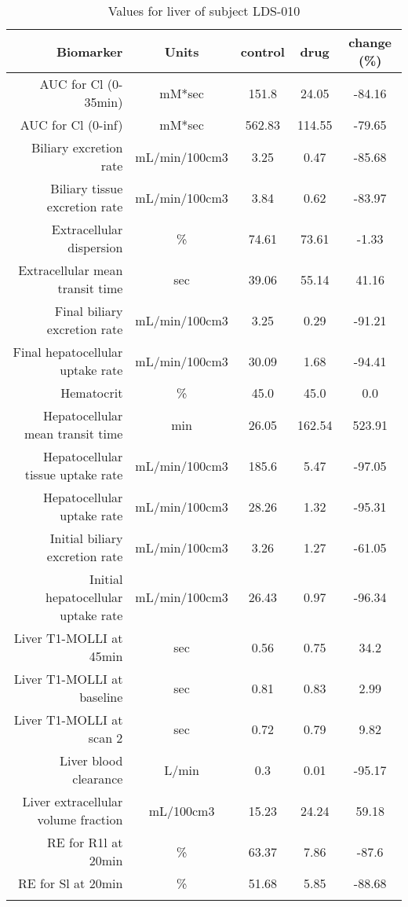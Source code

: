 \documentclass{epflreport}%
\begin{document}
%
\clearpage%
\begin{longtable}{rcccc}%
\hline%
Biomarker&Units&control&drug&change (\%)\\%
\hline%
AUC for Cl (0{-}35min)&mM*sec&151.8&24.05&{-}84.16\\%
AUC for Cl (0{-}inf)&mM*sec&562.83&114.55&{-}79.65\\%
Biliary excretion rate&mL/min/100cm3&3.25&0.47&{-}85.68\\%
Biliary tissue excretion rate&mL/min/100cm3&3.84&0.62&{-}83.97\\%
Extracellular dispersion&\%&74.61&73.61&{-}1.33\\%
Extracellular mean transit time&sec&39.06&55.14&41.16\\%
Final biliary excretion rate&mL/min/100cm3&3.25&0.29&{-}91.21\\%
Final hepatocellular uptake rate&mL/min/100cm3&30.09&1.68&{-}94.41\\%
Hematocrit&\%&45.0&45.0&0.0\\%
Hepatocellular mean transit time&min&26.05&162.54&523.91\\%
Hepatocellular tissue uptake rate&mL/min/100cm3&185.6&5.47&{-}97.05\\%
Hepatocellular uptake rate&mL/min/100cm3&28.26&1.32&{-}95.31\\%
Initial biliary excretion rate&mL/min/100cm3&3.26&1.27&{-}61.05\\%
Initial hepatocellular uptake rate&mL/min/100cm3&26.43&0.97&{-}96.34\\%
Liver T1{-}MOLLI at 45min&sec&0.56&0.75&34.2\\%
Liver T1{-}MOLLI at baseline&sec&0.81&0.83&2.99\\%
Liver T1{-}MOLLI at scan 2&sec&0.72&0.79&9.82\\%
Liver blood clearance&L/min&0.3&0.01&{-}95.17\\%
Liver extracellular volume fraction&mL/100cm3&15.23&24.24&59.18\\%
RE for R1l at 20min&\%&63.37&7.86&{-}87.6\\%
RE for Sl at 20min&\%&51.68&5.85&{-}88.68\\%
\hline%
\caption{Values for liver of subject LDS-010} \\%
\end{longtable}%
\end{document}
